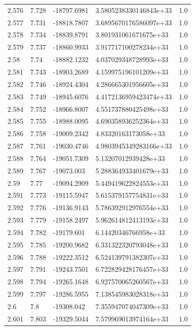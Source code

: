\begin{tabular}{lllll}
2.576 & 7.728 & -18797.6981 & 3.5805238330146843e+33 & 1.0 \\
2.577 & 7.731 & -18818.7807 & 3.6895670176586097e+33 & 1.0 \\
2.578 & 7.734 & -18839.8791 & 3.801931061671675e+33 & 1.0 \\
2.579 & 7.737 & -18860.9933 & 3.917717100278234e+33 & 1.0 \\
2.58 & 7.74 & -18882.1232 & 4.037029348728993e+33 & 1.0 \\
2.581 & 7.743 & -18903.2689 & 4.159975196101209e+33 & 1.0 \\
2.582 & 7.746 & -18924.4304 & 4.286665301956605e+33 & 1.0 \\
2.583 & 7.749 & -18945.6076 & 4.4172136959423474e+33 & 1.0 \\
2.584 & 7.752 & -18966.8007 & 4.551737880425498e+33 & 1.0 \\
2.585 & 7.755 & -18988.0095 & 4.690358936252364e+33 & 1.0 \\
2.586 & 7.758 & -19009.2342 & 4.83320163173058e+33 & 1.0 \\
2.587 & 7.761 & -19030.4746 & 4.9803945349283166e+33 & 1.0 \\
2.588 & 7.764 & -19051.7309 & 5.13207012939428e+33 & 1.0 \\
2.589 & 7.767 & -19073.003 & 5.288364933401679e+33 & 1.0 \\
2.59 & 7.77 & -19094.2909 & 5.449419622824553e+33 & 1.0 \\
2.591 & 7.773 & -19115.5947 & 5.615379157754831e+33 & 1.0 \\
2.592 & 7.776 & -19136.9143 & 5.786392912976554e+33 & 1.0 \\
2.593 & 7.779 & -19158.2497 & 5.962614812413193e+33 & 1.0 \\
2.594 & 7.782 & -19179.601 & 6.14420346766958e+33 & 1.0 \\
2.595 & 7.785 & -19200.9682 & 6.331322320793048e+33 & 1.0 \\
2.596 & 7.788 & -19222.3512 & 6.524139791382307e+33 & 1.0 \\
2.597 & 7.791 & -19243.7501 & 6.722829428176457e+33 & 1.0 \\
2.598 & 7.794 & -19265.1648 & 6.927570065260567e+33 & 1.0 \\
2.599 & 7.797 & -19286.5955 & 7.138545983028318e+33 & 1.0 \\
2.6 & 7.8 & -19308.042 & 7.355947074047309e+33 & 1.0 \\
2.601 & 7.803 & -19329.5044 & 7.579969013974164e+33 & 1.0 \\

\end{tabular}
